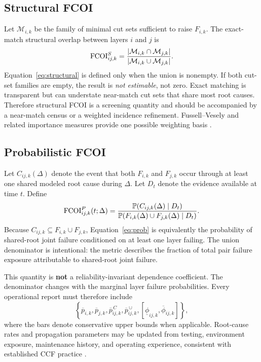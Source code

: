 \subsection{Structural FCOI}
Let $\mathcal{M}_{i,k}$ be the family of minimal cut sets sufficient to raise $F_{i,k}$. The exact-match structural overlap between layers $i$ and $j$ is
\begin{equation}
\operatorname{FCOI}^{S}_{ij,k}=
\frac{|\mathcal{M}_{i,k}\cap\mathcal{M}_{j,k}|}
{|\mathcal{M}_{i,k}\cup\mathcal{M}_{j,k}|}.
\label{eq:structural}
\end{equation}
Equation~\eqref{eq:structural} is defined only when the union is nonempty. If both cut-set families are empty, the result is \emph{not estimable}, not zero. Exact matching is transparent but can understate near-match cut sets that share most root causes. Therefore structural FCOI is a screening quantity and should be accompanied by a near-match census or a weighted incidence refinement. Fussell--Vesely and related importance measures provide one possible weighting basis \cite{Fussell1975,VanDerBorstSchoonakker2001}.

\subsection{Probabilistic FCOI}
Let $C_{ij,k}(\Delta)$ denote the event that both $F_{i,k}$ and $F_{j,k}$ occur through at least one shared modeled root cause during $\Delta$. Let $D_t$ denote the evidence available at time $t$. Define
\begin{equation}
\operatorname{FCOI}^{P}_{ij,k}(t;\Delta)=
\frac{\mathbb{P}(C_{ij,k}(\Delta)\mid D_t)}
{\mathbb{P}(F_{i,k}(\Delta)\cup F_{j,k}(\Delta)\mid D_t)}.
\label{eq:prob}
\end{equation}
Because $C_{ij,k}\subseteq F_{i,k}\cup F_{j,k}$, Equation~\eqref{eq:prob} is equivalently the probability of shared-root joint failure conditioned on at least one layer failing. The union denominator is intentional: the metric describes the fraction of total pair failure exposure attributable to shared-root joint failure.

This quantity is \textbf{not} a reliability-invariant dependence coefficient. The denominator changes with the marginal layer failure probabilities. Every operational report must therefore include
\begin{equation}
\left\{\overline{p}_{i,k},\overline{p}_{j,k},
\overline{p}^{\,C}_{ij,k},
\overline{p}^{\,\cup}_{ij,k},
[\underline{\phi}_{ij,k},\overline{\phi}_{ij,k}]\right\},
\label{eq:report}
\end{equation}
where the bars denote conservative upper bounds when applicable. Root-cause rates and propagation parameters may be updated from testing, environment exposure, maintenance history, and operating experience, consistent with established CCF practice \cite{Mosleh1998,MaKvarfordt2022}.

